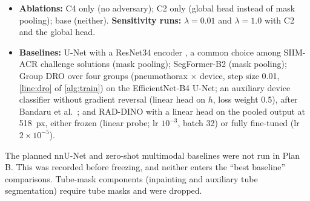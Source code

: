 \documentclass{ieeeaccess}
\begin{document}
\begin{itemize}
  \item \textbf{Ablations:} C4 only (no adversary); C2 only (global head instead of mask pooling); base (neither). \textbf{Sensitivity runs:} $\lambda=0.01$ and $\lambda=1.0$ with C2 and the global head.
  \item \textbf{Baselines:} U-Net with a ResNet34 encoder \cite{he2016resnet}, a common choice among SIIM-ACR challenge solutions (mask pooling); SegFormer-B2 \cite{xie2021segformer} (mask pooling); Group DRO \cite{sagawa2020groupdro} over four groups (pneumothorax $\times$ device, step size 0.01, \cref{line:dro} of \cref{alg:train}) on the EfficientNet-B4 U-Net; an auxiliary device classifier without gradient reversal (linear head on $h$, loss weight 0.5), after Bandaru et al.~\cite{bandaru2026untreated}; and RAD-DINO \cite{perezgarcia2025raddino} with a linear head on the pooled output at 518~px, either frozen (linear probe; lr $10^{-3}$, batch 32) or fully fine-tuned (lr $2\times10^{-5}$).
\end{itemize}

The planned nnU-Net \cite{isensee2021nnunet} and zero-shot multimodal baselines were not run in Plan B. This was recorded before freezing, and neither enters the ``best baseline'' comparisons. Tube-mask components (inpainting and auxiliary tube segmentation) require tube masks and were dropped.
\end{document}
